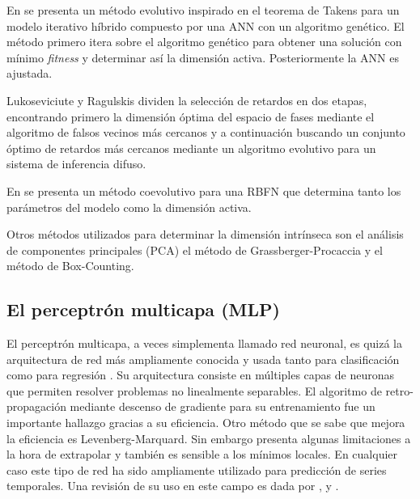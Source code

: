 \documentclass{llncs}
\begin{document}
En \cite{ferreira2008new} se presenta un método evolutivo inspirado en el teorema de Takens para un modelo iterativo híbrido compuesto por una ANN con un algoritmo genético. El método primero itera sobre el algoritmo genético para obtener una solución con mínimo \emph{fitness} y determinar así la dimensión activa. Posteriormente la ANN es ajustada. 

Lukoseviciute y Ragulskis \cite{lukoseviciute2010evolutionary} dividen la selección de retardos en dos etapas, encontrando primero la dimensión óptima del espacio de fases mediante el algoritmo de falsos vecinos más cercanos y a continuación buscando un conjunto óptimo de retardos más cercanos mediante un algoritmo evolutivo para un sistema de inferencia difuso.

En \cite{parras2012coevolution} se presenta un método coevolutivo para una RBFN que determina tanto los parámetros del modelo como la dimensión activa.

Otros métodos utilizados para determinar la dimensión intrínseca son el análisis de componentes principales (PCA) el método de Grassberger-Procaccia \cite{grassberger2004measuring} y  el método de Box-Counting. 


\subsection{El perceptrón multicapa (MLP)}

El perceptrón multicapa, a veces simplementa llamado red neuronal, es quizá la arquitectura de red más ampliamente conocida y usada tanto para clasificación como para regresión \cite{bishop1995neural}. Su arquitectura consiste en múltiples capas de neuronas que permiten resolver problemas no linealmente separables. El algoritmo de retro-propagación mediante descenso de gradiente para su entrenamiento fue un importante hallazgo gracias a su eficiencia. Otro método que se sabe que mejora la eficiencia es Levenberg-Marquard. Sin embargo presenta algunas limitaciones a la hora de extrapolar y también es sensible a los mínimos locales. En cualquier caso este tipo de red ha sido ampliamente utilizado para predicción de series temporales. Una revisión de su uso en este campo es dada por \cite{hippert2001neural}, \cite{azoff1994neural} y \cite{hoptroff1993principles}.
\end{document}
